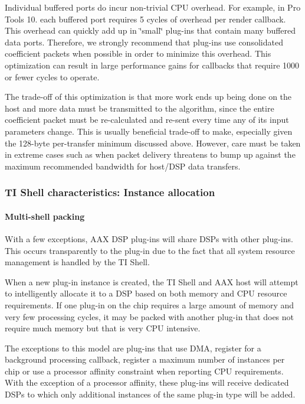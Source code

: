 Individual buffered ports do incur non-\/trivial C\+PU overhead. For example, in Pro Tools 10. each buffered port requires 5 cycles of overhead per render callback. This overhead can quickly add up in \char`\"{}small\char`\"{} plug-\/ins that contain many buffered data ports. Therefore, we strongly recommend that plug-\/ins use consolidated coefficient packets when possible in order to minimize this overhead. This optimization can result in large performance gains for callbacks that require 1000 or fewer cycles to operate.

The trade-\/off of this optimization is that more work ends up being done on the host and more data must be transmitted to the algorithm, since the entire coefficient packet must be re-\/calculated and re-\/sent every time any of its input parameters change. This is usually beneficial trade-\/off to make, especially given the 128-\/byte per-\/transfer minimum discussed above. However, care must be taken in extreme cases such as when packet delivery threatens to bump up against the maximum recommended bandwidth for host/\+D\+SP data transfers.

\hypertarget{a00832_subsection__ti_shell_characteristics_instance_allocation}{}\subsubsection{T\+I Shell characteristics\+: Instance allocation}\label{a00832_subsection__ti_shell_characteristics_instance_allocation}
 \hypertarget{a00832_subsubsection__multishell_packing_}{}\paragraph{Multi-\/shell packing}\label{a00832_subsubsection__multishell_packing_}
 With a few exceptions, A\+AX D\+SP plug-\/ins will share D\+S\+Ps with other plug-\/ins. This occurs transparently to the plug-\/in due to the fact that all system resource management is handled by the TI Shell.

When a new plug-\/in instance is created, the TI Shell and A\+AX host will attempt to intelligently allocate it to a D\+SP based on both memory and C\+PU resource requirements. If one plug-\/in on the chip requires a large amount of memory and very few processing cycles, it may be packed with another plug-\/in that does not require much memory but that is very C\+PU intensive.

The exceptions to this model are plug-\/ins that use D\+MA, register for a background processing callback, register a maximum number of instances per chip or use a processor affinity constraint when reporting C\+PU requirements. With the exception of a processor affinity, these plug-\/ins will receive dedicated D\+S\+Ps to which only additional instances of the same plug-\/in type will be added.

